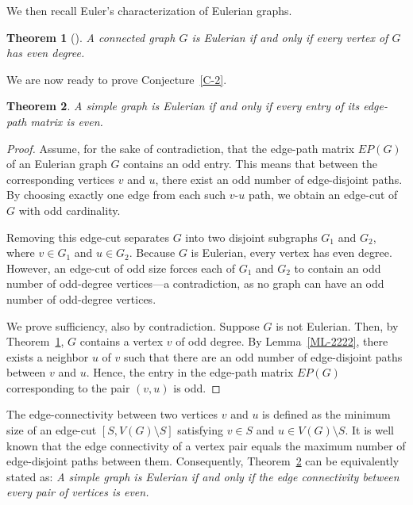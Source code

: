 \documentclass{article}
\newtheorem{theorem}{Theorem}[section]
\begin{document}
We then recall Euler's characterization of Eulerian graphs.

\begin{theorem}[\cite{Euler}]\label{TH-14}
A connected graph $G$ is Eulerian if and only if every vertex of $G$ has even degree.
\end{theorem}

We are now ready to prove Conjecture~\ref{C-2}.

\begin{theorem}\label{MT-44}
A simple graph is Eulerian if and only if every entry of its edge-path matrix is even.
\end{theorem}
\begin{proof}
Assume, for the sake of contradiction, that the edge-path matrix \(EP(G)\) of an Eulerian graph \(G\) contains an odd entry. This means that between the corresponding vertices \(v\) and \(u\), there exist an odd number of edge-disjoint paths. By choosing exactly one edge from each such \(v\)-\(u\) path, we obtain an edge-cut of \(G\) with odd cardinality.

Removing this edge-cut separates \(G\) into two disjoint subgraphs \(G_1\) and \(G_2\), where \(v \in G_1\) and \(u \in G_2\). Because \(G\) is Eulerian, every vertex has even degree. However, an edge-cut of odd size forces each of \(G_1\) and \(G_2\) to contain an odd number of odd-degree vertices—a contradiction, as no graph can have an odd number of odd-degree vertices. 

We prove sufficiency, also by contradiction. Suppose \(G\) is not Eulerian. Then, by Theorem~\ref{TH-14}, \(G\) contains a vertex \(v\) of odd degree. By Lemma~\ref{ML-2222}, there exists a neighbor \(u\) of \(v\) such that there are an odd number of edge-disjoint paths between \(v\) and \(u\). Hence, the entry in the edge-path matrix \(EP(G)\) corresponding to the pair \((v,u)\) is odd.
\end{proof}



The edge-connectivity between two vertices \( v \) and \( u \) is defined as the minimum size of an edge-cut \([S, V(G) \setminus S]\) satisfying \( v \in S \) and \( u \in V(G) \setminus S \). It is well known that the edge connectivity of a vertex pair equals the maximum number of edge-disjoint paths between them. Consequently, Theorem~\ref{MT-44} can be equivalently stated as:
\vskip0.2cm
{\it A simple graph is Eulerian if and only if the edge connectivity between every pair of vertices is even.}
\vskip0.2cm
\end{document}
